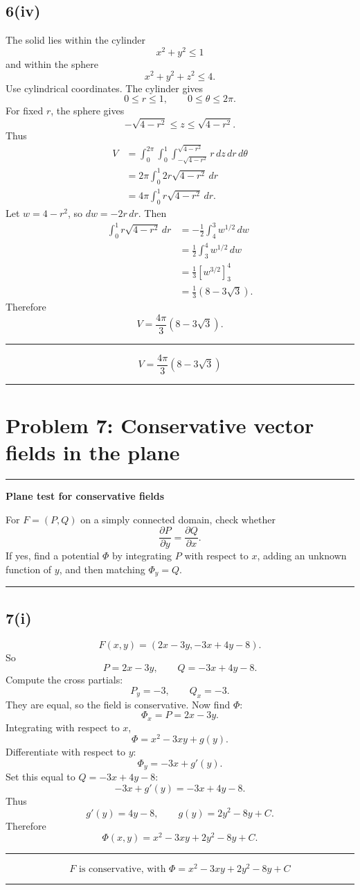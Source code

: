 \documentclass[11pt,a4paper]{article}
\newenvironment{methodbox}[1]{\par\medskip\noindent\begin{minipage}{\linewidth}\hrule\smallskip\textbf{#1}\par\smallskip}{\smallskip\hrule\end{minipage}\par\medskip}
\newenvironment{resultbox}{\par\medskip\noindent\begin{minipage}{\linewidth}\hrule\smallskip}{\smallskip\hrule\end{minipage}\par\medskip}
\newcommand{\ans}[1]{\begin{resultbox}\[\boxed{#1}\]\end{resultbox}}
\begin{document}
\subsection*{6(iv)}
The solid lies within the cylinder
\[
x^2+y^2\le1
\]
and within the sphere
\[
x^2+y^2+z^2\le4.
\]
Use cylindrical coordinates. The cylinder gives
\[
0\le r\le1,
\qquad 0\le\theta\le2\pi.
\]
For fixed \(r\), the sphere gives
\[
-\sqrt{4-r^2}\le z\le\sqrt{4-r^2}.
\]
Thus
\begin{align*}
V&=\int_0^{2\pi}\int_0^1\int_{-\sqrt{4-r^2}}^{\sqrt{4-r^2}}r\,dz\,dr\,d\theta\\
&=2\pi\int_0^1 2r\sqrt{4-r^2}\,dr\\
&=4\pi\int_0^1r\sqrt{4-r^2}\,dr.
\end{align*}
Let \(w=4-r^2\), so \(dw=-2r\,dr\). Then
\begin{align*}
\int_0^1r\sqrt{4-r^2}\,dr
&=-\frac12\int_4^3w^{1/2}\,dw\\
&=\frac12\int_3^4w^{1/2}\,dw\\
&=\frac13\left[w^{3/2}\right]_3^4\\
&=\frac13(8-3\sqrt3).
\end{align*}
Therefore
\[
V=\frac{4\pi}{3}(8-3\sqrt3).
\]
\ans{V=\frac{4\pi}{3}(8-3\sqrt3)}

\section{Problem 7: Conservative vector fields in the plane}

\begin{methodbox}{Plane test for conservative fields}
For \(F=(P,Q)\) on a simply connected domain, check whether
\[
\frac{\partial P}{\partial y}=\frac{\partial Q}{\partial x}.
\]
If yes, find a potential \(\Phi\) by integrating \(P\) with respect to \(x\), adding an unknown function of \(y\), and then matching \(\Phi_y=Q\).
\end{methodbox}

\subsection*{7(i)}
\[
F(x,y)=(2x-3y,
-3x+4y-8).
\]
So
\[
P=2x-3y,
\qquad Q=-3x+4y-8.
\]
Compute the cross partials:
\[
P_y=-3,
\qquad Q_x=-3.
\]
They are equal, so the field is conservative. Now find \(\Phi\):
\[
\Phi_x=P=2x-3y.
\]
Integrating with respect to \(x\),
\[
\Phi=x^2-3xy+g(y).
\]
Differentiate with respect to \(y\):
\[
\Phi_y=-3x+g'(y).
\]
Set this equal to \(Q=-3x+4y-8\):
\[
-3x+g'(y)=-3x+4y-8.
\]
Thus
\[
g'(y)=4y-8,
\qquad g(y)=2y^2-8y+C.
\]
Therefore
\[
\Phi(x,y)=x^2-3xy+2y^2-8y+C.
\]
\ans{F\text{ is conservative, with }\Phi=x^2-3xy+2y^2-8y+C}
\end{document}
